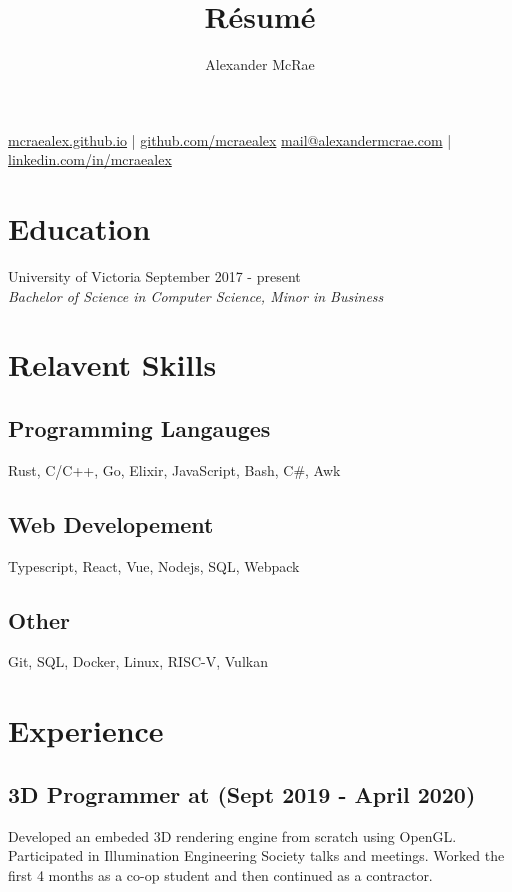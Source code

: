 \documentclass{article}
\makeatletter
\renewcommand{\maketitle}{
\begin{center}
{\huge \bfseries \theauthor}

\vspace{0.25em}
\url{mcraealex.github.io} | \url{github.com/mcraealex}
\href{mailto:mail@alexandermcrae.com}{mail@alexandermcrae.com} | \href{https://linkedin.com/in/mcraealex}{linkedin.com/in/mcraealex}
\end{center}}
\newcommand{\hrefColored}[3]{\href{#2}{\color{#1}{#3}}}
\makeatother
\begin{document}
\title{R\'esum\'e}
\author{Alexander McRae}

\maketitle

\section{Education}

\noindent University of Victoria \hfill September 2017 - present\\
\textit{Bachelor of Science in Computer Science, Minor in Business}

\section{Relavent Skills}

\subsection{Programming Langauges}

Rust, C/C++, Go, Elixir, JavaScript, Bash, C\#, Awk

\subsection{Web Developement}

Typescript, React, Vue, Nodejs, SQL, Webpack

\subsection{Other}

Git, SQL, Docker, Linux, RISC-V, Vulkan

\section{Experience}

\subsection{3D Programmer at \hrefColored{blue}{https://www.suntrackertech.com}{Suntracker Technologies Ltd.} (Sept 2019 - April 2020)}

Developed an embeded 3D rendering engine from scratch using OpenGL. Participated
in Illumination Engineering Society talks and meetings. Worked the first 4 
months as a co-op student and then continued as a contractor.
\end{document}
